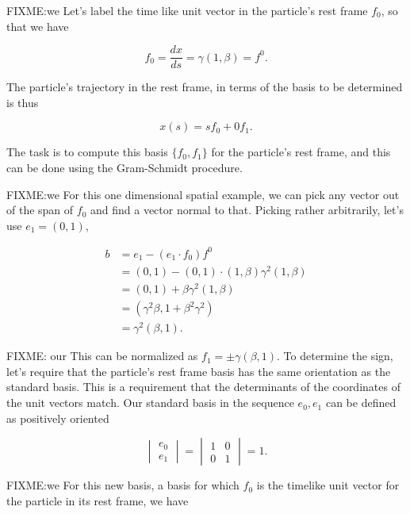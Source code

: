 FIXME:we
Let's label the time like unit vector in the particle's rest frame $f_0$, so that we have

\begin{equation}\label{eqn:grahamSchmidtLorentz:620}
f_0 = \frac{dx}{ds} = \gamma (1, \beta) = f^0.
\end{equation}

The particle's trajectory in the rest frame, in terms of the basis to be determined is thus

\begin{equation}\label{eqn:grahamSchmidtLorentz:640}
x(s) = s f_0 + 0 f_1.
\end{equation}

The task is to compute this basis $\{f_0, f_1\}$ for the particle's rest frame, and this can be done using the Gram-Schmidt procedure.

FIXME:we
For this one dimensional spatial example, we can pick any vector out of the span of $f_0$ and find a vector normal to that.  Picking rather arbitrarily, let's use $e_1 = (0, 1)$,

\begin{align*}
b
&= e_1 - (e_1 \cdot f_0) f^0 \\
&= (0, 1) - (0, 1) \cdot (1, \beta) \gamma^2 (1, \beta) \\
&= (0, 1) + \beta \gamma^2 (1, \beta) \\
&= (\gamma^2 \beta, 1 + \beta^2 \gamma^2) \\
&= \gamma^2 (\beta, 1 ).
\end{align*}

FIXME: our
This can be normalized as $f_1 = \pm \gamma(\beta, 1)$.  To determine the sign, let's require that the particle's rest frame basis has the same orientation as the standard basis.  This is a requirement that the determinants of the coordinates of the unit vectors match.  Our standard basis in the sequence $e_0, e_1$ can be defined as positively oriented

\begin{equation}\label{eqn:grahamSchmidtLorentz:680}
\begin{vmatrix}
e_0 \\
e_1
\end{vmatrix}
=
\begin{vmatrix}
1 & 0 \\
0 & 1
\end{vmatrix}
= 1.
\end{equation}

FIXME:we
For this new basis, a basis for which $f_0$ is the timelike unit vector for the particle in its rest frame, we have

